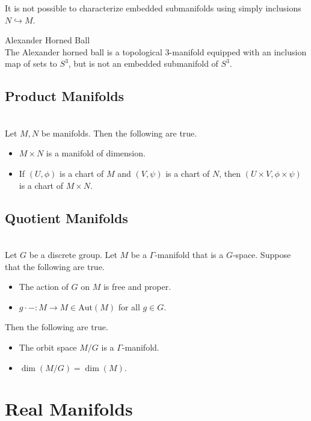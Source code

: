 \documentclass[a4paper]{article}
\begin{document}
It is not possible to characterize embedded submanifolds using simply inclusions $N\hookrightarrow M$. 

\begin{eg}{Alexander Horned Ball}{}\\
The Alexander horned ball is a topological $3$-manifold equipped with an inclusion map of sets to $S^3$, but is not an embedded submanifold of $S^3$. 
\end{eg}

\subsection{Product Manifolds}
\begin{prp}{}{}\\
Let $M,N$ be manifolds. Then the following are true. 
\begin{itemize}
\item $M\times N$ is a manifold of dimension. 
\item If $(U,\phi)$ is a chart of $M$ and $(V,\psi)$ is a chart of $N$, then $(U\times V,\phi\times\psi)$ is a chart of $M\times N$. 
\end{itemize}
\end{prp}

\subsection{Quotient Manifolds}
\begin{prp}{}{}\\
Let $G$ be a discrete group. Let $M$ be a $\Gamma$-manifold that is a $G$-space. Suppose that the following are true. 
\begin{itemize}
\item The action of $G$ on $M$ is free and proper. 
\item $g\cdot -:M\to M\in\text{Aut}(M)$ for all $g\in G$. 
\end{itemize}
Then the following are true. 
\begin{itemize}
\item The orbit space $M/G$ is a $\Gamma$-manifold. 
\item $\dim(M/G)=\dim(M)$. 
\end{itemize}
\end{prp}

\pagebreak
\section{Real Manifolds}
\end{document}
